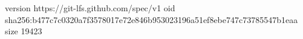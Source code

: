 version https://git-lfs.github.com/spec/v1
oid sha256:b477c7c0320a7f3578017e72e846b953023196a51ef8ebe747c73785547b1eaa
size 19423
